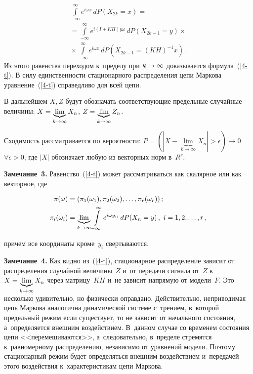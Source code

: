 \begin{multicols}{2}
\noindent
\begin{multline*}
\int\limits^\infty_{-\infty}\!\!e^{i \omega x} \,dP(X_{2k}=x)={}\\
{}=\int\limits^\infty_{-\infty}\!\!e^{i(I+KH)y\omega}\,dP(X_{2k-1}=y)\times{}\\
{}\times
\int\limits^\infty_{-\infty}\!\!e^{i \omega x} \,dP(X_{2k-1}=(KH)^{-1}x)\,.
\end{multline*}
Из этого равенства переходом к~пределу при $k\hm\rightarrow \infty$
доказывается формула~(\ref{4-t}). В силу единственности стационарного
распределения цепи Маркова уравнение~(\ref{4-t}) справедливо для всей цепи.

\smallskip

В дальнейшем $X, Z$ будут обозначать соответствующие предельные случайные
величины:
$X\hm=\underbrace{\lim}_{k\rightarrow \infty}X_n$,
$Z\hm=\underbrace{\lim}_{k\rightarrow \infty}Z_n$.

Сходимость рассматривается по вероятности:
$P=(|X-\underbrace{\lim}_{k\rightarrow \infty}X_n|>\epsilon)\rightarrow 0$
$\forall\epsilon > 0$, где $|X|$ обозначает любую из векторных норм в~$R^r$.

\smallskip

\noindent
\textbf{Замечание~3.} Равенство~(\ref{4-t})  может рассматриваться
как скалярное или как векторное, где

\noindent
\begin{align*}
\pi(\omega)&=(\pi_1(\omega_1), \pi_2(\omega_2), \ldots ,\pi_r(\omega_r))\,;\\
\pi_i(\omega_i)&=\underbrace{\lim}_{k\rightarrow \infty}
\int\limits^\infty_{-\infty}e^{i \omega y_{ii}}\, dP(X_{n}\hm=y)\,,\
i=1,2,\ldots,r\,,
\end{align*}

\vspace*{-2pt}

\noindent
 причем все координаты кроме~$y_i$ свертываются.

\smallskip

\noindent
\textbf{Замечание~4.} Как видно из~(\ref{4-t}), стационарное распределение
зависит от распределения случайной величины~$Z$ и~от передачи сигнала от~$Z$
к~$X\hm=\underbrace{\lim}_{k\rightarrow \infty} X_n$ через матрицу~$KH$ и~не
зависит напрямую от модели~$F$. Это несколько удивительно, но физически оправдано.
Действительно, неприводимая цепь Маркова аналогична динамической системе с~трением,
в~которой предельный режим если существует, то не зависит от начального состояния,
а~определяется внешним воздействием. В~данном случае со временем состояния цепи
<<перемешиваются>>, а~следовательно, в~пределе стремятся к~равномерному
распределению, независимо от уравнений модели. Поэтому стационарный режим
будет определяться внешним воздействием и~передачей этого воздействия
к~характеристикам цепи Маркова.


\end{multicols}
